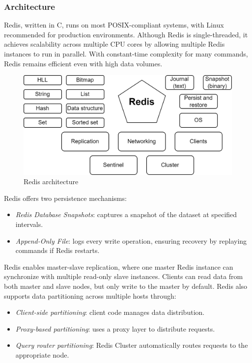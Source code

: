 \subsubsection{Architecture}
Redis, written in C, runs on most POSIX-compliant systems, with Linux recommended for production environments. 
Although Redis is single-threaded, it achieves scalability across multiple CPU cores by allowing multiple Redis instances to run in parallel. 
With constant-time complexity for many commands, Redis remains efficient even with high data volumes.
\begin{figure}[H]
    \centering
    \includegraphics[width=0.75\linewidth]{images/redis.png}
    \caption{Redis architecture}
\end{figure}
\noindent Redis offers two persistence mechanisms:
\begin{itemize}
    \item \textit{Redis Database Snapshots}: captures a snapshot of the dataset at specified intervals.
    \item \textit{Append-Only File}: logs every write operation, ensuring recovery by replaying commands if Redis restarts.
\end{itemize}
Redis enables master-slave replication, where one master Redis instance can synchronize with multiple read-only slave instances. 
Clients can read data from both master and slave nodes, but only write to the master by default. 
Redis also supports data partitioning across multiple hosts through:
\begin{itemize}
    \item \textit{Client-side partitioning}: client code manages data distribution.
    \item \textit{Proxy-based partitioning}: uses a proxy layer to distribute requests.
    \item \textit{Query router partitioning}: Redis Cluster automatically routes requests to the appropriate node.
\end{itemize}

